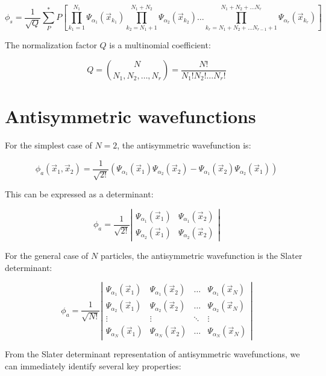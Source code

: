 \begin{equation}
\phi_s=\frac{1}{\sqrt{Q}}\sum_P^* P\left[\prod_{k_1=1}^{N_1}\Psi_{\alpha_1}(\vec{x}_{k_1})\prod_{k_2=N_1+1}^{N_1+N_2}\Psi_{\alpha_2}(\vec{x}_{k_2})\ldots\prod_{k_r=N_1+N_2+\ldots N_{r-1}+1}^{N_1+N_2+\ldots N_r}\Psi_{\alpha_r}(\vec{x}_{k_r})\right]
\end{equation}

The normalization factor $Q$ is a multinomial coefficient:

\begin{equation}
Q=\binom{N}{N_1,N_2,\ldots,N_r}=\frac{N!}{N_1!N_2!\ldots N_r!}
\end{equation}

\section{Antisymmetric wavefunctions}
For the simplest case of $N=2$, the antisymmetric wavefunction is:

\begin{equation}
\phi_a(\vec{x}_1,\vec{x}_2)=\frac{1}{\sqrt{2!}}(\Psi_{\alpha_1}(\vec{x}_1)\Psi_{\alpha_2}(\vec{x}_2)-\Psi_{\alpha_1}(\vec{x}_2)\Psi_{\alpha_2}(\vec{x}_1))
\end{equation}

This can be expressed as a determinant:

\[
\phi_a=\frac{1}{\sqrt{2!}}\left|\begin{array}{ll}
\Psi_{\alpha_1}(\vec{x}_1) & \Psi_{\alpha_1}(\vec{x}_2) \\
\Psi_{\alpha_2}(\vec{x}_1) & \Psi_{\alpha_2}(\vec{x}_2)
\end{array}\right|
\]

For the general case of $N$ particles, the antisymmetric wavefunction is the Slater determinant:

\[
\phi_a=\frac{1}{\sqrt{N!}}\left|\begin{array}{cccc}
\Psi_{\alpha_1}(\vec{x}_1) & \Psi_{\alpha_1}(\vec{x}_2) & \ldots & \Psi_{\alpha_1}(\vec{x}_N) \\
\Psi_{\alpha_2}(\vec{x}_1) & \Psi_{\alpha_2}(\vec{x}_2) & \ldots & \Psi_{\alpha_2}(\vec{x}_N)\\
\vdots & \vdots & \ddots & \vdots\\
\Psi_{\alpha_N}(\vec{x}_1) & \Psi_{\alpha_N}(\vec{x}_2) & \ldots & \Psi_{\alpha_N}(\vec{x}_N)
\end{array}\right|
\]


From the Slater determinant representation of antisymmetric wavefunctions, we can immediately identify several key properties:

